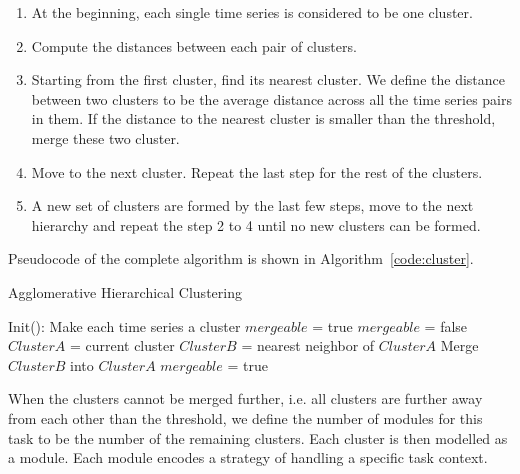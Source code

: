 \begin{enumerate}
\item At the beginning, each single time series is considered to be one cluster.
\item Compute the distances between each pair of clusters.
\item Starting from the first cluster, find its nearest cluster. We define the distance between two clusters to be the average distance across all the time series pairs in them. If the distance to the nearest cluster is smaller than the threshold, merge these two cluster.
\item Move to the next cluster. Repeat the last step for the rest of the clusters.
\item A new set of clusters are formed by the last few steps, move to the next hierarchy and repeat the step 2 to 4 until no new clusters can be formed.
\end{enumerate}

Pseudocode of the complete algorithm is shown in Algorithm~\ref{code:cluster}.

\begin{algorithm}
  \caption{Agglomerative Hierarchical Clustering}
  \begin{algorithmic}[1]
    \State Init(): Make each time series a cluster\;
    \State $mergeable$ = true\;
      \State $mergeable$ = false\;
        \State $ClusterA$ = current cluster\;
        \State $ClusterB$ = nearest neighbor of $ClusterA$\;
            \State Merge $ClusterB$ into $ClusterA$\;
            \State $mergeable$ = true\;
        \EndIf
      \EndFor
    \EndWhile
    \EndFunction
  \end{algorithmic}
  \label{code:cluster}
\end{algorithm}

When the clusters cannot be merged further, i.e. all clusters are further away from each other than the threshold, we define the number of modules for this task to be the number of the remaining clusters. Each cluster is then modelled as a module. Each module encodes a strategy of handling a specific task context.



